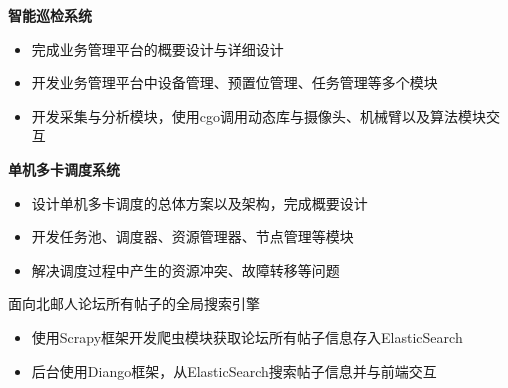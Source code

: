 \documentclass{resume}
\begin{document}
\textbf{智能巡检系统}
\begin{itemize}
  \item 完成业务管理平台的概要设计与详细设计
  \item 开发业务管理平台中设备管理、预置位管理、任务管理等多个模块
  \item 开发采集与分析模块，使用cgo调用动态库与摄像头、机械臂以及算法模块交互
\end{itemize}

\textbf{单机多卡调度系统}
\begin{itemize}
  \item 设计单机多卡调度的总体方案以及架构，完成概要设计
  \item 开发任务池、调度器、资源管理器、节点管理等模块
  \item 解决调度过程中产生的资源冲突、故障转移等问题
\end{itemize}

\begin{onehalfspacing}
面向北邮人论坛所有帖子的全局搜索引擎
\begin{itemize}
  \item 使用Scrapy框架开发爬虫模块获取论坛所有帖子信息存入ElasticSearch
  \item 后台使用Diango框架，从ElasticSearch搜索帖子信息并与前端交互
\end{itemize}
\end{onehalfspacing}


\end{document}
